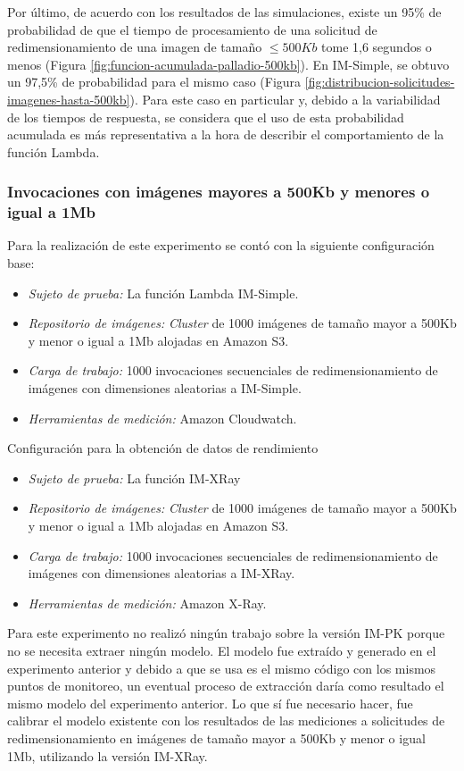 Por último, de acuerdo con los resultados de las simulaciones, existe un 95\% de probabilidad de que el tiempo de procesamiento de una solicitud de redimensionamiento de una imagen de tamaño $\leq 500Kb$ tome 1,6 segundos o menos (Figura \ref{fig:funcion-acumulada-palladio-500kb}). En IM-Simple, se obtuvo un 97,5\% de probabilidad para el mismo caso (Figura \ref{fig:distribucion-solicitudes-imagenes-hasta-500kb}). Para este caso en particular y, debido a la variabilidad de los tiempos de respuesta, se considera que el uso de esta probabilidad acumulada es más representativa a la hora de describir el comportamiento de la función Lambda.

\subsubsection{Invocaciones con imágenes mayores a 500Kb y menores o igual a 1Mb}
Para la realización de este experimento se contó con la siguiente configuración base:
\begin{itemize}
    \item \emph{Sujeto de prueba:} La función Lambda IM-Simple.
    \item \emph{Repositorio de imágenes:} \emph{Cluster} de 1000 imágenes de tamaño mayor a 500Kb y menor o igual a 1Mb alojadas en Amazon S3.     
    \item \emph{Carga de trabajo:} 1000 invocaciones secuenciales de redimensionamiento de imágenes con dimensiones aleatorias a IM-Simple.
    \item \emph{Herramientas de medición:} Amazon Cloudwatch.
\end{itemize}

Configuración para la obtención de datos de rendimiento

\begin{itemize}
    \item \emph{Sujeto de prueba:} La función IM-XRay
    \item \emph{Repositorio de imágenes:} \emph{Cluster} de 1000 imágenes de tamaño mayor a 500Kb y menor o igual a 1Mb alojadas en Amazon S3.     
    \item \emph{Carga de trabajo:} 1000 invocaciones secuenciales de redimensionamiento de imágenes con dimensiones aleatorias a IM-XRay.
    \item \emph{Herramientas de medición:} Amazon X-Ray.
\end{itemize}

Para este experimento no realizó ningún trabajo sobre la versión IM-PK porque no se necesita extraer ningún modelo. El modelo fue extraído y generado en el experimento anterior y debido a que se usa es el mismo código con los mismos puntos de monitoreo, un eventual proceso de extracción daría como resultado el mismo modelo del experimento anterior. Lo que sí fue necesario hacer, fue calibrar el modelo existente con los resultados de las mediciones a solicitudes de redimensionamiento en imágenes de tamaño mayor a 500Kb y menor o igual 1Mb, utilizando la versión IM-XRay. 

